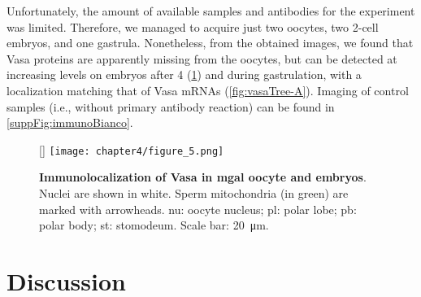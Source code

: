 Unfortunately, the amount of available samples and antibodies for the experiment was limited. Therefore, we managed to acquire just two oocytes, two 2-cell embryos, and one gastrula. Nonetheless, from the obtained images, we found that Vasa proteins are apparently missing from the oocytes, but can be detected at increasing levels on embryos after \qty{4}{\hpf} (\cref{fig:immuno}) and during gastrulation, with a localization matching that of Vasa mRNAs (\cref{fig:vasaTree-A}). Imaging of control samples (i.e., without primary antibody reaction) can be found in \cref{suppFig:immunoBianco}.

\begingroup
\captionsetup[figure]{format=hruleformat}
\begin{figure}
	[\FBwidth]
	{\texttt{[image: chapter4/figure\_5.png]}}
	{\caption[\textbf{Immunolocalization of Vasa in \gls{mgal} oocyte and embryos}]
	{
		\textbf{Immunolocalization of Vasa in \gls{mgal} oocyte and embryos}. Nuclei are shown in white. Sperm mitochondria (in green) are marked with arrowheads. nu: oocyte nucleus; pl: polar lobe; pb: polar body; st: stomodeum. Scale bar: \qty{20}{\um}.
	}
	\label{fig:immuno}}
\end{figure}

\section{Discussion} \label{chapter:insitu-discussion}
